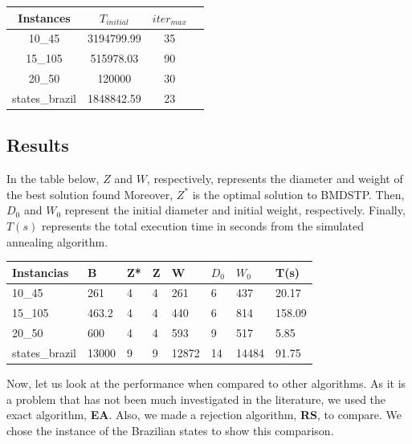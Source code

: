 \documentclass[12pt]{article}
\begin{document}
\begin{table}[H]
\centering
    \begin{tabular}{@{}cccc@{}}
    \toprule
    Instances & $T_{initial}$ & $iter_{max}$  \\ \midrule
    10\_45 & 3194799.99      & 35          \\ 
    15\_105 & 515978.03     & 90          \\
    20\_50 & 120000      & 30          \\ 
    states\_brazil &  1848842.59      & 23           \\
    \bottomrule
    \end{tabular}
\end{table}

\subsection{Results}

In the table below, $Z$ and $W$, respectively, represents the diameter and weight of the best solution found Moreover, $Z^*$ is the optimal solution to BMDSTP. Then, $D_0$ and $W_0$ represent the initial diameter and initial weight, respectively. Finally, $T(s)$ represents the total execution time in seconds from the simulated annealing algorithm.  

\begin{table}[H]
    \centering
        \begin{tabular}{@{}llllllll@{}}
        \toprule
        Instancias & B & Z* & Z & W & $D_0$ & $W_0$ & T(s) \\ \midrule
        10\_45 & 261 & 4 & 4 & 261 & 6 & 437 & 20.17 \\
        15\_105 & 463.2 & 4 & 4 & 440 & 6 & 814 &  158.09\\
        20\_50 &  600 & 4 & 4 & 593 & 9  & 517  & 5.85\\
        states\_brazil   & 13000 & 9 & 9 & 12872     & 14                & 14484  & 91.75\\ \bottomrule
        \end{tabular}
    \end{table}
    
Now, let us look at the performance when compared to other algorithms. As it is a problem that has not been much investigated in the literature, we used the exact algorithm, \textbf{EA}. Also, we made a rejection algorithm, \textbf{RS}, to compare. 
We chose the instance of the Brazilian states to show this comparison.
\end{document}

